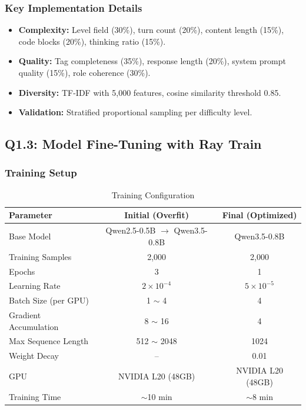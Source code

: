 \documentclass[12pt,a4paper]{article}
\begin{document}
\subsubsection{Key Implementation Details}

\begin{itemize}[leftmargin=*]
    \item \textbf{Complexity:} Level field (30\%), turn count (20\%), content length (15\%), code blocks (20\%), thinking ratio (15\%).
    \item \textbf{Quality:} Tag completeness (35\%), response length (20\%), system prompt quality (15\%), role coherence (30\%).
    \item \textbf{Diversity:} TF-IDF with 5,000 features, cosine similarity threshold 0.85.
    \item \textbf{Validation:} Stratified proportional sampling per difficulty level.
\end{itemize}

\subsection{Q1.3: Model Fine-Tuning with Ray Train}

\subsubsection{Training Setup}

\begin{table}[H]
\centering
\caption{Training Configuration}
\begin{tabular}{lcc}
\toprule
\textbf{Parameter} & \textbf{Initial (Overfit)} & \textbf{Final (Optimized)} \\
\midrule
Base Model & Qwen2.5-0.5B $\rightarrow$ Qwen3.5-0.8B & Qwen3.5-0.8B \\
Training Samples & 2,000 & 2,000 \\
Epochs & 3 & 1 \\
Learning Rate & $2\times10^{-4}$ & $5\times10^{-5}$ \\
Batch Size (per GPU) & 1 $\sim$ 4 & 4 \\
Gradient Accumulation & 8 $\sim$ 16 & 4 \\
Max Sequence Length & 512 $\sim$ 2048 & 1024 \\
Weight Decay & -- & 0.01 \\
GPU & NVIDIA L20 (48GB) & NVIDIA L20 (48GB) \\
Training Time & $\sim$10 min & $\sim$8 min \\
\bottomrule
\end{tabular}
\end{table}
\end{document}
